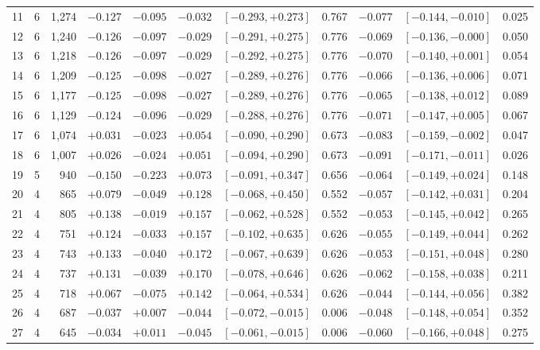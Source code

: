 \documentclass[11pt]{article}
\begin{document}
\begin{table}[p]
\begin{tabular}{@{}rrr rr rcc rcc@{}}
11 & 6 & 1{,}274 & $-0.127$ & $-0.095$ & $-0.032$ & $[-0.293,+0.273]$ & 0.767 & $-0.077$ & $[-0.144,-0.010]$ & 0.025 \\
12 & 6 & 1{,}240 & $-0.126$ & $-0.097$ & $-0.029$ & $[-0.291,+0.275]$ & 0.776 & $-0.069$ & $[-0.136,-0.000]$ & 0.050 \\
13 & 6 & 1{,}218 & $-0.126$ & $-0.097$ & $-0.029$ & $[-0.292,+0.275]$ & 0.776 & $-0.070$ & $[-0.140,+0.001]$ & 0.054 \\
14 & 6 & 1{,}209 & $-0.125$ & $-0.098$ & $-0.027$ & $[-0.289,+0.276]$ & 0.776 & $-0.066$ & $[-0.136,+0.006]$ & 0.071 \\
15 & 6 & 1{,}177 & $-0.125$ & $-0.098$ & $-0.027$ & $[-0.289,+0.276]$ & 0.776 & $-0.065$ & $[-0.138,+0.012]$ & 0.089 \\
16 & 6 & 1{,}129 & $-0.124$ & $-0.096$ & $-0.029$ & $[-0.288,+0.276]$ & 0.776 & $-0.071$ & $[-0.147,+0.005]$ & 0.067 \\
17 & 6 & 1{,}074 & $+0.031$ & $-0.023$ & $+0.054$ & $[-0.090,+0.290]$ & 0.673 & $-0.083$ & $[-0.159,-0.002]$ & 0.047 \\
18 & 6 & 1{,}007 & $+0.026$ & $-0.024$ & $+0.051$ & $[-0.094,+0.290]$ & 0.673 & $-0.091$ & $[-0.171,-0.011]$ & 0.026 \\
19 & 5 & 940 & $-0.150$ & $-0.223$ & $+0.073$ & $[-0.091,+0.347]$ & 0.656 & $-0.064$ & $[-0.149,+0.024]$ & 0.148 \\
20 & 4 & 865 & $+0.079$ & $-0.049$ & $+0.128$ & $[-0.068,+0.450]$ & 0.552 & $-0.057$ & $[-0.142,+0.031]$ & 0.204 \\
21 & 4 & 805 & $+0.138$ & $-0.019$ & $+0.157$ & $[-0.062,+0.528]$ & 0.552 & $-0.053$ & $[-0.145,+0.042]$ & 0.265 \\
22 & 4 & 751 & $+0.124$ & $-0.033$ & $+0.157$ & $[-0.102,+0.635]$ & 0.626 & $-0.055$ & $[-0.149,+0.044]$ & 0.262 \\
23 & 4 & 743 & $+0.133$ & $-0.040$ & $+0.172$ & $[-0.067,+0.639]$ & 0.626 & $-0.053$ & $[-0.151,+0.048]$ & 0.280 \\
24 & 4 & 737 & $+0.131$ & $-0.039$ & $+0.170$ & $[-0.078,+0.646]$ & 0.626 & $-0.062$ & $[-0.158,+0.038]$ & 0.211 \\
25 & 4 & 718 & $+0.067$ & $-0.075$ & $+0.142$ & $[-0.064,+0.534]$ & 0.626 & $-0.044$ & $[-0.144,+0.056]$ & 0.382 \\
26 & 4 & 687 & $-0.037$ & $+0.007$ & $-0.044$ & $[-0.072,-0.015]$ & 0.006 & $-0.048$ & $[-0.148,+0.054]$ & 0.352 \\
27 & 4 & 645 & $-0.034$ & $+0.011$ & $-0.045$ & $[-0.061,-0.015]$ & 0.006 & $-0.060$ & $[-0.166,+0.048]$ & 0.275 \\

\end{tabular}
\end{table}
\end{document}
